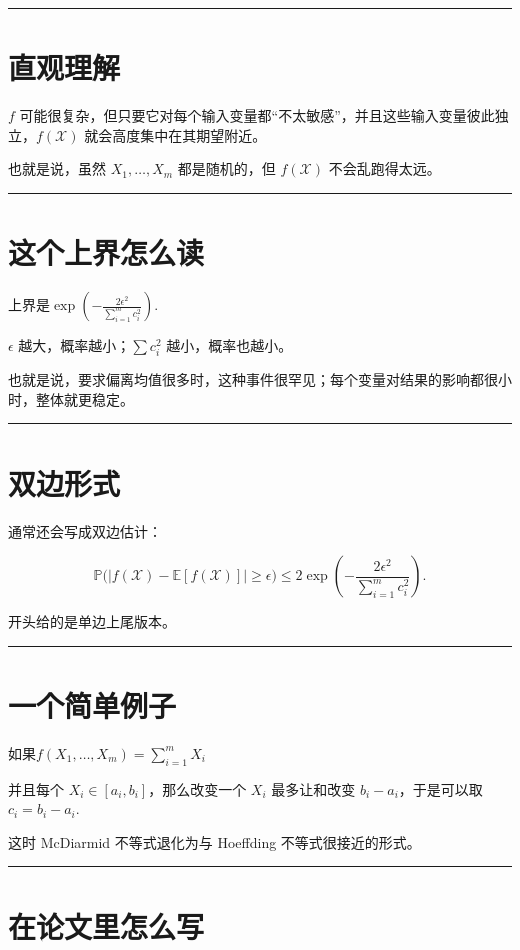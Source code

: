 \hrule

\section{直观理解}

\(f\) 可能很复杂，但只要它对每个输入变量都“不太敏感”，并且这些输入变量彼此独立，\(f(\mathcal X)\) 就会高度集中在其期望附近。

也就是说，虽然 \(X_1,\dots,X_m\) 都是随机的，但 \(f(\mathcal X)\) 不会乱跑得太远。

\hrule

\section{这个上界怎么读}

上界是\(\exp\!\left(-\frac{2\epsilon^2}{\sum_{i=1}^m c_i^2}\right).\)

\(\epsilon\) 越大，概率越小；\(\sum c_i^2\) 越小，概率也越小。

也就是说，要求偏离均值很多时，这种事件很罕见；每个变量对结果的影响都很小时，整体就更稳定。

\hrule

\section{双边形式}

通常还会写成双边估计：

\[
\mathbb P\bigl(|f(\mathcal X)-\mathbb E[f(\mathcal X)]|\ge \epsilon\bigr) \le 2\exp\!\left(-\frac{2\epsilon^2}{\sum_{i=1}^m c_i^2}\right).
\]

开头给的是单边上尾版本。

\hrule

\section{一个简单例子}

如果\(f(X_1,\dots,X_m)=\sum_{i=1}^m X_i\)

并且每个 \(X_i\in[a_i,b_i]\)，那么改变一个 \(X_i\) 最多让和改变 \(b_i-a_i\)，于是可以取\(c_i=b_i-a_i.\)

这时 McDiarmid 不等式退化为与 Hoeffding 不等式很接近的形式。

\hrule

\section{在论文里怎么写}

